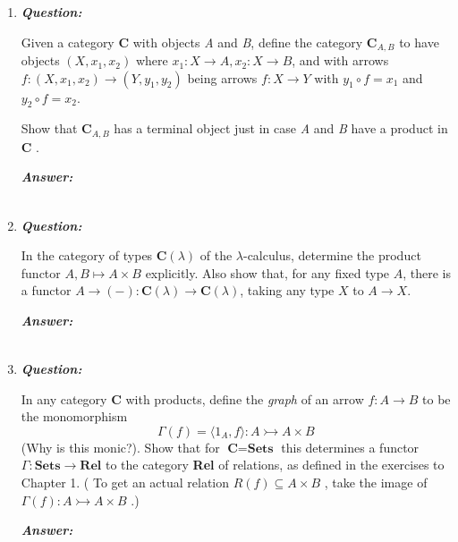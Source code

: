 \documentclass{article}
\begin{document}
\begin{enumerate}
	\item
	      \textbf{\textit{Question:}}

	      Given a category \textbf{C} with objects \textit{A} and \textit{B}, define the category $ \textbf{C}_{A,B} $ to have objects $ (X,x_1,x_2) $ where $ x_1 : X \to A, x_2 : X \to B  $, and with arrows $ f : (X,x_1, x_2) \to (Y, y_1, y_2) $ being arrows $ f : X \to Y $ with $ y_1 \circ f = x_1 $ and $ y_2 \circ f = x_2 $.

	      Show that $ \textbf{C}_{A,B} $ has a terminal object just in case \textit{A} and \textit{B} have a product in \textbf{C} .

	      \textbf{\textit{Answer:}}

	      \begin{align*}
	      \end{align*}


	\item
	      \textbf{\textit{Question:}}

	      In the category of types $ \textbf{C} (\lambda) $ of the $ \lambda  $-calculus, determine the product functor $ A,B \mapsto A \times B $ explicitly. Also show that, for any fixed type $ A $, there is a functor $ A \to (-) : \textbf{C} (\lambda) \to \textbf{C} (\lambda) $, taking any type $ X $ to $ A \to X $.

	      \textbf{\textit{Answer:}}

	      \begin{align*}
	      \end{align*}


	\item
	      \textbf{\textit{Question:}}

	      In any category \textbf{C} with products, define the \textit{graph} of an arrow $ f : A \to B $ to be the monomorphism
	      \begin{displaymath}
		      \Gamma (f) =  \langle 1_A, f \rangle : A \rightarrowtail A \times B
	      \end{displaymath}
	      (Why is this monic?). Show that for $ \textbf{C} = \textbf{Sets}  $ this determines a functor $ \Gamma : \textbf{Sets} \to \textbf{Rel}  $ to the category \textbf{Rel} of relations, as defined in the exercises to Chapter 1. ( To get an actual relation $ R(f) \subseteq A \times B $ , take the image of $ \Gamma (f) : A \rightarrowtail A \times B $ .)



	      \textbf{\textit{Answer:}}


\end{enumerate}
\end{document}

